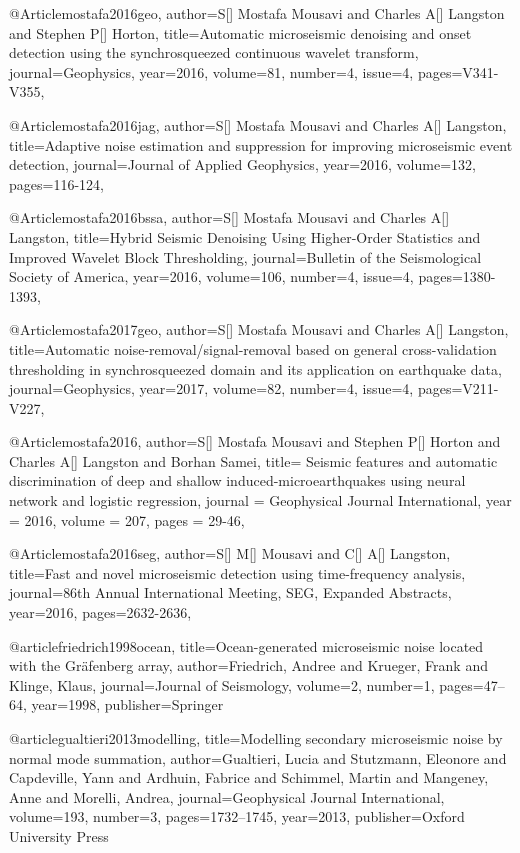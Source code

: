 @Article{mostafa2016geo,
  author={S[] Mostafa Mousavi and Charles A[] Langston and Stephen P[] Horton},
  title={Automatic microseismic denoising and onset detection using the synchrosqueezed continuous wavelet transform},
  journal={Geophysics},
  year=2016,
  volume=81,
  number=4,
  issue=4,
  pages={V341-V355},
}

@Article{mostafa2016jag,
  author={S[] Mostafa Mousavi and Charles A[] Langston},
  title={Adaptive noise estimation and suppression for improving microseismic event detection},
  journal={Journal of Applied Geophysics},
  year=2016,
  volume=132,
  pages={116-124},
}

@Article{mostafa2016bssa,
  author={S[] Mostafa Mousavi and Charles A[] Langston},
  title={Hybrid Seismic Denoising Using Higher-Order Statistics and Improved Wavelet Block Thresholding},
  journal={Bulletin of the Seismological Society of America},
  year=2016,
  volume=106,
  number=4,
  issue=4,
  pages={1380-1393},
}

@Article{mostafa2017geo,
  author={S[] Mostafa Mousavi and Charles A[] Langston},
  title={Automatic noise-removal/signal-removal based on general cross-validation thresholding in synchrosqueezed domain and its application on earthquake data},
  journal={Geophysics},
  year=2017,
  volume=82,
  number=4,
  issue=4,
  pages={V211-V227},
}

@Article{mostafa2016,
  author={S[] Mostafa Mousavi and Stephen P[] Horton and Charles A[] Langston and Borhan Samei},
  title={ Seismic features and automatic discrimination of deep and shallow induced-microearthquakes using neural network and logistic regression},
  journal = 	 {Geophysical Journal International},
  year = 	 2016,
  volume =	 207,
  pages =	 {29-46},
}

  @Article{mostafa2016seg,
  author={S[] M[] Mousavi and C[] A[] Langston},
  title={Fast and novel microseismic detection using time-frequency analysis},
  journal={86th Annual International Meeting, SEG, Expanded Abstracts},
  year=2016,
  pages={2632-2636},
}

@article{friedrich1998ocean,
  title={Ocean-generated microseismic noise located with the Gr{\"a}fenberg array},
  author={Friedrich, Andree and Krueger, Frank and Klinge, Klaus},
  journal={Journal of Seismology},
  volume={2},
  number={1},
  pages={47--64},
  year={1998},
  publisher={Springer}
}

@article{gualtieri2013modelling,
  title={Modelling secondary microseismic noise by normal mode summation},
  author={Gualtieri, Lucia and Stutzmann, Eleonore and Capdeville, Yann and Ardhuin, Fabrice and Schimmel, Martin and Mangeney, Anne and Morelli, Andrea},
  journal={Geophysical Journal International},
  volume={193},
  number={3},
  pages={1732--1745},
  year={2013},
  publisher={Oxford University Press}
}

